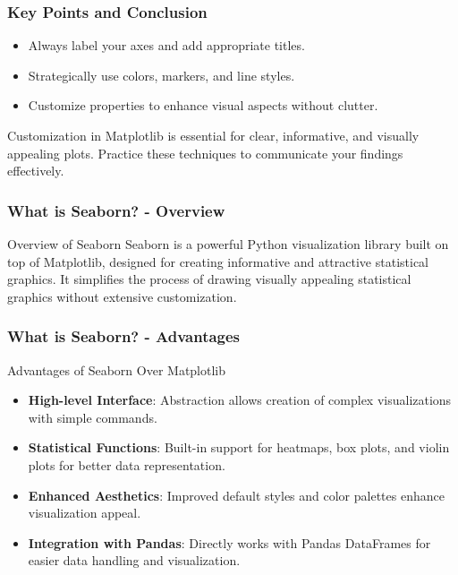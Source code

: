 \documentclass[aspectratio=169]{beamer}
\begin{document}
\begin{frame}[fragile]
    \frametitle{Key Points and Conclusion}
    \begin{itemize}
        \item Always label your axes and add appropriate titles.
        \item Strategically use colors, markers, and line styles.
        \item Customize properties to enhance visual aspects without clutter.
    \end{itemize}
    Customization in Matplotlib is essential for clear, informative, and visually appealing plots. Practice these techniques to communicate your findings effectively.
\end{frame}

\begin{frame}[fragile]
    \frametitle{What is Seaborn? - Overview}
    \begin{block}{Overview of Seaborn}
        Seaborn is a powerful Python visualization library built on top of Matplotlib, designed for creating informative and attractive statistical graphics. It simplifies the process of drawing visually appealing statistical graphics without extensive customization.
    \end{block}
\end{frame}

\begin{frame}[fragile]
    \frametitle{What is Seaborn? - Advantages}
    \begin{block}{Advantages of Seaborn Over Matplotlib}
        \begin{itemize}
            \item \textbf{High-level Interface}: Abstraction allows creation of complex visualizations with simple commands.
            \item \textbf{Statistical Functions}: Built-in support for heatmaps, box plots, and violin plots for better data representation.
            \item \textbf{Enhanced Aesthetics}: Improved default styles and color palettes enhance visualization appeal.
            \item \textbf{Integration with Pandas}: Directly works with Pandas DataFrames for easier data handling and visualization.
        \end{itemize}
    \end{block}
\end{frame}
\end{document}
